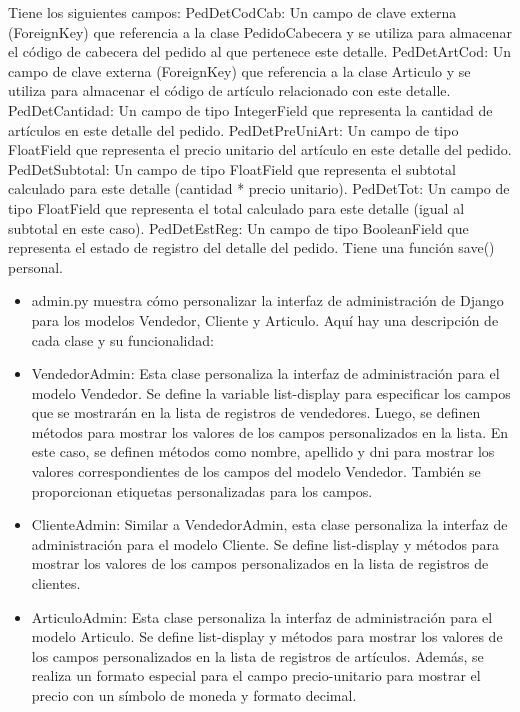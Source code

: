 \documentclass{article}
\begin{document}
\begin{itemize}
\begin{itemize}
\begin{itemize}
                Tiene los siguientes campos:
                PedDetCodCab: Un campo de clave externa (ForeignKey) que referencia a la clase PedidoCabecera y se utiliza para almacenar el código de cabecera del pedido al que pertenece este detalle.
                PedDetArtCod: Un campo de clave externa (ForeignKey) que referencia a la clase Articulo y se utiliza para almacenar el código de artículo relacionado con este detalle.
                PedDetCantidad: Un campo de tipo IntegerField que representa la cantidad de artículos en este detalle del pedido.
                PedDetPreUniArt: Un campo de tipo FloatField que representa el precio unitario del artículo en este detalle del pedido.
                PedDetSubtotal: Un campo de tipo FloatField que representa el subtotal calculado para este detalle (cantidad * precio unitario).
                PedDetTot: Un campo de tipo FloatField que representa el total calculado para este detalle (igual al subtotal en este caso).
                PedDetEstReg: Un campo de tipo BooleanField que representa el estado de registro del detalle del pedido.
                Tiene una función save() personal.
            \end{itemize}
            
            \begin{itemize}
                \begin{itemize}
                    \item admin.py muestra cómo personalizar la interfaz de administración de Django para los modelos Vendedor, Cliente y Articulo. Aquí hay una descripción de cada clase y su funcionalidad:
                    \item VendedorAdmin: Esta clase personaliza la interfaz de administración para el modelo Vendedor. Se define la variable list-display para especificar los campos que se mostrarán en la lista de registros de vendedores. Luego, se definen métodos para mostrar los valores de los campos personalizados en la lista. En este caso, se definen métodos como nombre, apellido y dni para mostrar los valores correspondientes de los campos del modelo Vendedor. También se proporcionan etiquetas personalizadas para los campos.
                    \item ClienteAdmin: Similar a VendedorAdmin, esta clase personaliza la interfaz de administración para el modelo Cliente. Se define list-display y métodos para mostrar los valores de los campos personalizados en la lista de registros de clientes.
                    \item ArticuloAdmin: Esta clase personaliza la interfaz de administración para el modelo Articulo. Se define list-display y métodos para mostrar los valores de los campos personalizados en la lista de registros de artículos. Además, se realiza un formato especial para el campo precio-unitario para mostrar el precio con un símbolo de moneda y formato decimal.

\end{itemize}
\end{itemize}
\end{itemize}
\end{itemize}
\end{document}
